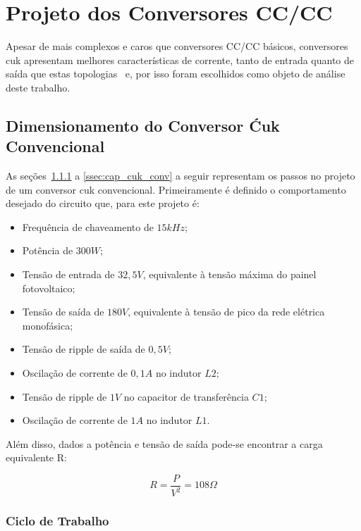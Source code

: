 \documentclass[
	12pt,				%
	openright,			%
	twoside,			%
	a4paper,			%
	english,			%
	french,				%
	spanish,			%
	brazil,				%
	]{abntex2}
\begin{document}
\section{Projeto dos Conversores CC/CC}

Apesar de mais complexos e caros que conversores CC/CC básicos, conversores cuk apresentam melhores características de corrente, tanto de entrada quanto de saída que estas topologias~\cite{JOSEPH_2017_Intervealed_CUK} e, por isso foram escolhidos como objeto de análise deste trabalho.

\subsection{Dimensionamento do Conversor Ćuk Convencional} \label{ssec:cuk_conv_met}

As seções~\ref{ssec:d_cuk_conv} a \ref{ssec:cap_cuk_conv} a seguir representam os passos no projeto de um conversor cuk convencional. Primeiramente é definido o comportamento desejado do circuito que, para este projeto é:

\begin{itemize}%
	\item Frequência de chaveamento de $15kHz$;
	\item Potência de $300W$;
	\item Tensão de entrada de $32,5V$, equivalente à tensão máxima do painel fotovoltaico;
	\item Tensão de saída de $180V$, equivalente à tensão de pico da rede elétrica monofásica;
	\item Tensão de ripple de saída de $0,5V$;
	\item Oscilação de corrente de $0,1A$ no indutor $L2$;
	\item Tensão de ripple de $1V$ no capacitor de transferência $C1$;
	\item Oscilação de corrente de $1A$ no indutor $L1$.
\end{itemize}

Além disso, dados a potência e tensão de saída pode-se encontrar a carga equivalente R:

\begin{equation}%
	R = \frac{P}{V^2} = 108 \Omega \label{eq:cuk_load}
\end{equation}

\subsubsection{Ciclo de Trabalho}\label{ssec:d_cuk_conv}
\end{document}
